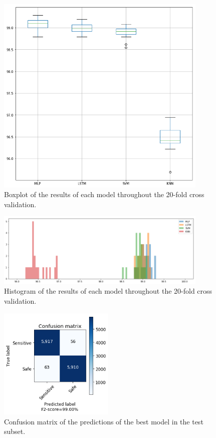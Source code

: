 \begin{figure}[!ht]
    \centering
    \includegraphics[width=0.9\textwidth]{img/results/boxplot.png}
    \caption{Boxplot of the results of each model throughout the 20-fold cross validation.}
    \label{fig:results-boxplot}
\end{figure}

\begin{figure}[!ht]
    \centering
    \includegraphics[width=0.9\textwidth]{img/results/histogram.png}
    \caption{Histogram of the results of each model throughout the 20-fold cross validation.}
    \label{fig:results-histogram}
\end{figure}

\begin{figure}[!ht]
    \centering
    \includegraphics[width=0.49\textwidth]{img/results/MLP-TEST.png}
    \caption{Confusion matrix of the predictions of the best model in the test subset.}
    \label{fig:cf-test}
\end{figure}

